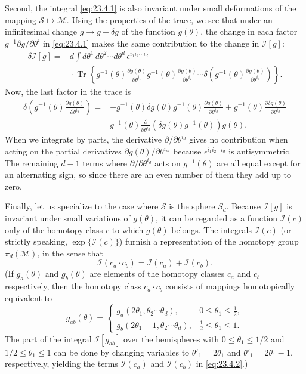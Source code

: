 Second, the integral \eqref{eq:23.4.1} is also invariant under small
deformations of the mapping $\mathcal S\mapsto\mathcal M$. Using the
properties of the trace, we see that under an infinitesimal change
$g\to g+\delta g$ of the function $g(\theta)$, the change in each factor
$g^{-1}\partial g/\partial\theta^{i}$ in \eqref{eq:23.4.1} makes the same
contribution to the change in $\mathcal I[g]$:
\begin{align*}
\delta\mathcal I[g]={}&d\int d\theta^1\,d\theta^2\cdots d\theta^d\,
\epsilon^{i_1i_2\cdots i_d}
\\
&{}\cdot\operatorname{Tr}\left\{
g^{-1}(\theta)\frac{\partial g(\theta)}{\partial\theta^{i_1}}
g^{-1}(\theta)\frac{\partial g(\theta)}{\partial\theta^{i_2}}
\cdots
\delta\left(
g^{-1}(\theta)\frac{\partial g(\theta)}{\partial\theta^{i_d}}
\right)\right\}.
\end{align*}
Now, the last factor in the trace is
\begin{align*}
\delta\left(
g^{-1}(\theta)\frac{\partial g(\theta)}{\partial\theta^{i_d}}
\right)
={}&-g^{-1}(\theta)\delta g(\theta)g^{-1}(\theta)
\frac{\partial g(\theta)}{\partial\theta^{i_d}}
+g^{-1}(\theta)\frac{\partial\delta g(\theta)}
{\partial\theta^{i_d}}
\\
={}&g^{-1}(\theta)\frac{\partial}{\partial\theta^{i_d}}
\left(\delta g(\theta)g^{-1}(\theta)\right)g(\theta).
\end{align*}
When we integrate by parts, the derivative
$\partial/\partial\theta^{i_d}$ gives no contribution when acting on the
partial derivatives $\partial g(\theta)/\partial\theta^{i_m}$ because
$\epsilon^{i_1i_2\cdots i_d}$ is antisymmetric. The remaining $d-1$
terms where $\partial/\partial\theta^{i_d}$ acts on $g^{-1}(\theta)$ are
all equal except for an alternating sign, so since there are an even
number of them they add up to zero.

Finally, let us specialize to the case where $\mathcal S$ is the sphere
$S_d$. Because $\mathcal I[g]$ is invariant under small variations of
$g(\theta)$, it can be regarded as a function $\mathcal I(c)$ only of the
homotopy class $c$ to which $g(\theta)$ belongs. The integrals
$\mathcal I(c)$ (or strictly speaking, $\exp\{\mathcal I(c)\}$) furnish a
representation of the homotopy group $\pi_d(\mathcal M)$, in the sense
that
\begin{equation}
\mathcal I(c_a\cdot c_b)=\mathcal I(c_a)+\mathcal I(c_b).
\tag{23.4.2}\label{eq:23.4.2}
\end{equation}
(If $g_a(\theta)$ and $g_b(\theta)$ are elements of the homotopy classes
$c_a$ and $c_b$ respectively, then the homotopy class $c_a\cdot c_b$
consists of mappings homotopically equivalent to
\[
g_{ab}(\theta)=
\begin{cases}
g_a(2\theta_1,\theta_2\cdots\theta_d),
&0\leq\theta_1\leq\tfrac12,\\
g_b(2\theta_1-1,\theta_2\cdots\theta_d),
&\tfrac12\leq\theta_1\leq1.
\end{cases}
\]
The part of the integral $\mathcal I[g_{ab}]$ over the hemispheres with
$0\leq\theta_1\leq1/2$ and $1/2\leq\theta_1\leq1$ can be done by changing
variables to $\theta'_1=2\theta_1$ and $\theta'_1=2\theta_1-1$,
respectively, yielding the terms $\mathcal I(c_a)$ and $\mathcal I(c_b)$
in \eqref{eq:23.4.2}.)

